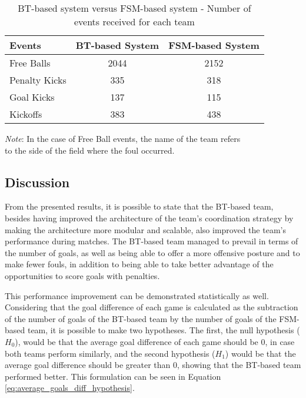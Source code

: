 \begin{table}[h]
    \begin{minipage}{\columnwidth}
        \centering
        \begin{tabular}{l c c}
            \toprule
            Events        & BT-based System & FSM-based System \\
            \midrule
            Free Balls    & 2044            & 2152             \\
            Penalty Kicks & 335             & 318              \\
            Goal Kicks    & 137             & 115              \\
            Kickoffs      & 383             & 438              \\
            \bottomrule
        \end{tabular}
        \begin{center}
            \footnotesize
            \emph{Note}: In the case of Free Ball events, the name of the team refers \\
            to the side of the field where the foul occurred.
        \end{center}
    \end{minipage}
    \caption{BT-based system versus FSM-based system - Number of events received for each team}
    \label{tab:fouls_count}
\end{table}

\subsection{Discussion}

From the presented results, it is possible to state that the BT-based team, besides having improved the architecture of the team's coordination strategy by making the architecture more modular and scalable, also improved the team's performance during matches. The BT-based team managed to prevail in terms of the number of goals, as well as being able to offer a more offensive posture and to make fewer fouls, in addition to being able to take better advantage of the opportunities to score goals with penalties.

This performance improvement can be demonstrated statistically as well. Considering that the goal difference of each game is calculated as the subtraction of the number of goals of the BT-based team by the number of goals of the FSM-based team, it is possible to make two hypotheses. The first, the null hypothesis ($H_0$), would be that the average goal difference of each game should be 0, in case both teams perform similarly, and the second hypothesis ($H_1$) would be that the average goal difference should be greater than 0, showing that the BT-based team performed better. This formulation can be seen in Equation \ref{eq:average_goals_diff_hypothesis}.

